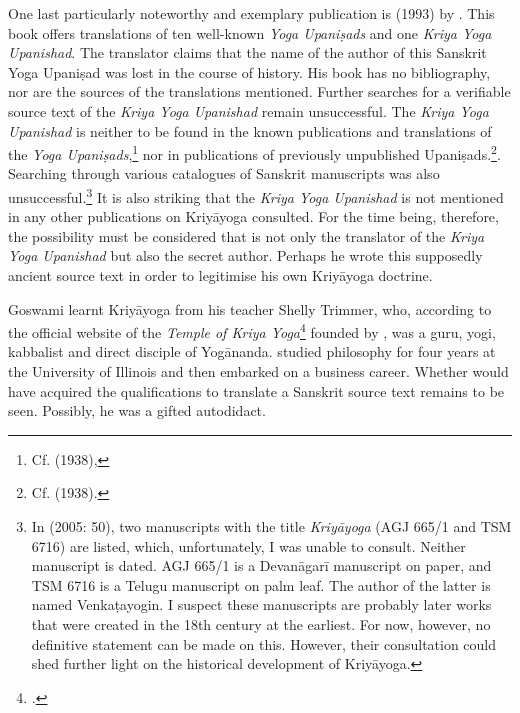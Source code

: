 One last particularly noteworthy and exemplary publication is  (1993) by \citeauthor{kriyayogaupanishad1993}. This book offers translations of ten well-known \textit{Yoga Upaniṣads} and one \textit{Kriya Yoga Upanishad}. The translator claims that the name of the author of this Sanskrit Yoga Upaniṣad was lost in the course of history. His book has no bibliography, nor are the sources of the translations mentioned. Further searches for a verifiable source text of the \textit{Kriya Yoga Upanishad} remain unsuccessful. The \textit{Kriya Yoga Upanishad} is neither to be found in the known publications and translations of the \textit{Yoga Upaniṣads},\footnote{Cf.  (1938),} nor in publications of previously unpublished Upaniṣads.\footnote{Cf.  (1938).}. Searching through various catalogues of Sanskrit manuscripts was also unsuccessful.\footnote{In  (2005: 50), two manuscripts with the title \textit{Kriyāyoga} (AGJ 665/1 and TSM 6716) are listed, which, unfortunately, I was unable to consult. Neither manuscript is dated. AGJ 665/1 is a Devanāgarī manuscript on paper, and TSM 6716 is a Telugu manuscript on palm leaf. The author of the latter is named Venkaṭayogin. I suspect these manuscripts are probably later works that were created in the 18th century at the earliest. For now, however, no definitive statement can be made on this. However, their consultation could shed further light on the historical development of Kriyāyoga.} It is also striking that the \textit{Kriya Yoga Upanishad} is not mentioned in any other publications on Kriyāyoga consulted. For the time being, therefore, the possibility must be considered that \citeauthor{kriyayogaupanishad1993} is not only the translator of the \textit{Kriya Yoga Upanishad} but also the secret author. Perhaps he wrote this supposedly ancient source text in order to legitimise his own Kriyāyoga doctrine.   

Goswami \citeauthor{kriyayogaupanishad1993} learnt Kriyāyoga from his teacher Shelly Trimmer, who, according to the official website of the \textit{Temple of Kriya Yoga}\footnote{\cite{goswamikriyananda}.} founded by \citeauthor{kriyayogaupanishad1993}, was a guru, yogi, kabbalist and direct disciple of Yogānanda. \citeauthor{kriyayogaupanishad1993} studied philosophy for four years at the University of Illinois and then embarked on a business career. Whether \citeauthor{kriyayogaupanishad1993} would have acquired the qualifications to translate a Sanskrit source text remains to be seen. Possibly, he was a gifted autodidact.


